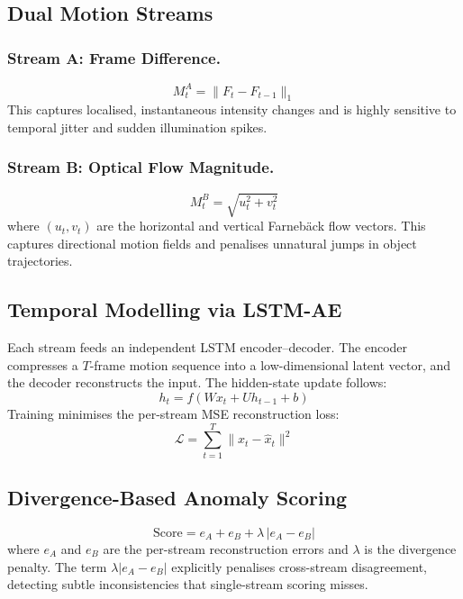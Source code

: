 \documentclass[runningheads]{llncs}
\begin{document}
\subsection{Dual Motion Streams}

\subsubsection{Stream A: Frame Difference.}
\begin{equation}
M^A_t = \|F_t - F_{t-1}\|_1
\label{eq:fd}
\end{equation}
This captures localised, instantaneous intensity changes and is highly
sensitive to temporal jitter and sudden illumination spikes.

\subsubsection{Stream B: Optical Flow Magnitude.}
\begin{equation}
M^B_t = \sqrt{u_t^2 + v_t^2}
\label{eq:of}
\end{equation}
where $(u_t, v_t)$ are the horizontal and vertical Farneb\"{a}ck flow
vectors. This captures directional motion fields and penalises unnatural
jumps in object trajectories.

\subsection{Temporal Modelling via LSTM-AE}
Each stream feeds an independent LSTM encoder--decoder. The encoder
compresses a $T$-frame motion sequence into a low-dimensional latent
vector, and the decoder reconstructs the input. The hidden-state update
follows:
\begin{equation}
h_t = f(Wx_t + Uh_{t-1} + b)
\label{eq:lstm}
\end{equation}
Training minimises the per-stream MSE reconstruction loss:
\begin{equation}
\mathcal{L} = \sum_{t=1}^{T}\|x_t - \hat{x}_t\|^2
\label{eq:loss}
\end{equation}

\subsection{Divergence-Based Anomaly Scoring}
\begin{equation}
\mathrm{Score} = e_A + e_B + \lambda\,|e_A - e_B|
\label{eq:score}
\end{equation}
where $e_A$ and $e_B$ are the per-stream reconstruction errors and
$\lambda$ is the divergence penalty. The term $\lambda|e_A - e_B|$
explicitly penalises cross-stream disagreement, detecting subtle
inconsistencies that single-stream scoring misses.
\end{document}
